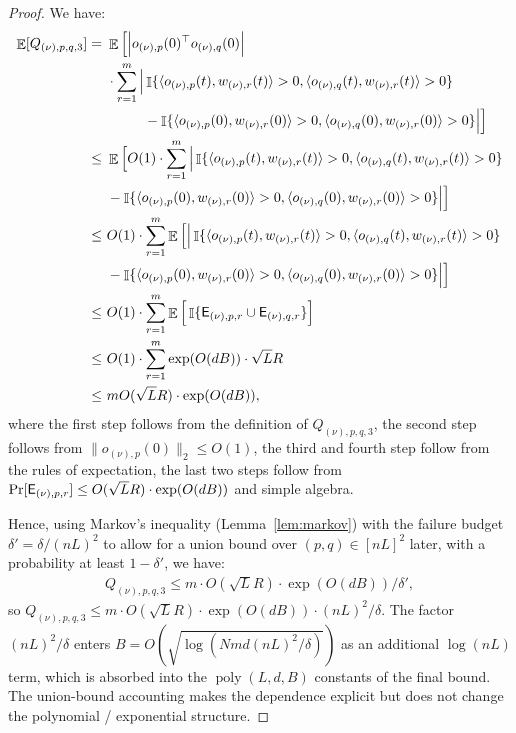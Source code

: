 \documentclass[11pt]{article}
\theoremstyle{plain}
\DeclareMathOperator*{\E}{{\mathbb{E}}}
\DeclareMathOperator{\poly}{poly}
\DeclareMathOperator{\I}{\mathbb{I}}
\begin{document}
\begin{proof}
    We have:
    \begin{align*}
        \E[Q_{(\nu), p, q, 3}] = & ~ \E\Big[ \Big|   o_{(\nu), p}(0)^\top   o_{(\nu), q}(0) \Big| \\
        & ~ \cdot \sum_{r=1}^m \Big| \I\{\langle  o_{(\nu), p}(t), w_{(\nu), r}(t)\rangle > 0, \langle  o_{(\nu), q}(t), w_{(\nu), r}(t)\rangle > 0\} \\
        & ~ \quad \quad ~ ~  - \I\{\langle  o_{(\nu), p}(0), w_{(\nu), r}(0)\rangle > 0, \langle  o_{(\nu), q}(0), w_{(\nu), r}(0)\rangle > 0\} \Big|\Big] \\
        \leq & ~ \E\Big[ O(1)\cdot \sum_{r=1}^m \Big| \I\{\langle  o_{(\nu), p}(t), w_{(\nu), r}(t)\rangle > 0, \langle  o_{(\nu), q}(t), w_{(\nu), r}(t)\rangle > 0\} \\
        & ~  - \I\{\langle  o_{(\nu), p}(0), w_{(\nu), r}(0)\rangle > 0, \langle  o_{(\nu), q}(0), w_{(\nu), r}(0)\rangle > 0\} \Big|\Big] \\
        \leq & ~ O(1)\cdot \sum_{r=1}^m \E\Big[\Big| \I\{\langle  o_{(\nu), p}(t), w_{(\nu), r}(t)\rangle > 0, \langle  o_{(\nu), q}(t), w_{(\nu), r}(t)\rangle > 0\} \\
        & ~  - \I\{\langle  o_{(\nu), p}(0), w_{(\nu), r}(0)\rangle > 0, \langle  o_{(\nu), q}(0), w_{(\nu), r}(0)\rangle > 0\} \Big|\Big] \\
        \leq & ~ O(1)\cdot \sum_{r=1}^m \E\Big[\I\{ {\sf E}_{(\nu), p, r} \cup {\sf E}_{(\nu), q, r} \}\Big] \\
        \leq & ~ O(1)\cdot \sum_{r=1}^m  \exp(O(dB)) \cdot \sqrt{L}R \\
        \leq & ~ m O(\sqrt{L}R) \cdot \exp(O(dB)),
    \end{align*}
    where the first step follows from the definition of $Q_{(\nu),p, q,3}$, the second step follows from $\| o_{(\nu), p}(0)\|_2\leq O(1)$, the third and fourth step follow from the rules of expectation, the last two steps follow from $\Pr[{\sf E}_{(\nu), p, r}] \leq O(\sqrt{L}R) \cdot \exp(O(dB))$ and simple algebra.

    Hence, using Markov's inequality (Lemma~\ref{lem:markov}) with the failure budget $\delta'=\delta/(nL)^2$ to allow for a union bound over $(p,q)\in[nL]^2$ later, with a probability at least $1 - \delta'$, we have:
    \begin{align*}
        Q_{(\nu), p, q, 3} \leq m \cdot O(\sqrt{L}R) \cdot \exp(O(dB)) /\delta',
    \end{align*}
    so $Q_{(\nu),p,q,3} \le m\cdot O(\sqrt L R)\cdot \exp(O(dB))\cdot (nL)^2/\delta$. The factor $(nL)^2/\delta$ enters $B = O(\sqrt{\log(Nmd(nL)^2/\delta)})$ as an additional $\log(nL)$ term, which is absorbed into the $\poly(L,d,B)$ constants of the final bound. The union-bound accounting makes the dependence explicit but does not change the polynomial / exponential structure.


\end{proof}
\end{document}
